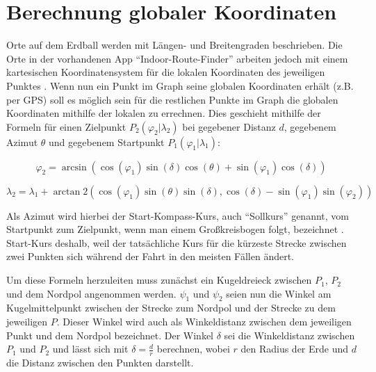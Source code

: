 
\section{Berechnung globaler Koordinaten}
Orte auf dem Erdball werden mit Längen- und Breitengraden beschrieben. Die Orte in der vorhandenen App \enquote{Indoor-Route-Finder} arbeiten jedoch mit einem kartesischen Koordinatensystem für die lokalen Koordinaten des jeweiligen Punktes \cite{kneer_benjamin_indoor_2017}. Wenn nun ein Punkt im Graph seine globalen Koordinaten erhält (z.B. per GPS) soll es möglich sein für die restlichen Punkte im Graph die globalen Koordinaten mithilfe der lokalen zu errechnen. Dies geschieht mithilfe der Formeln für einen Zielpunkt $P_2(\varphi_2|\lambda_2)$ bei gegebener Distanz $d$, gegebenem Azimut $\theta$ und gegebenem Startpunkt $P_1(\varphi_1|\lambda_1)$:

\begin{equation}
\tag{1}
\varphi_2 = \arcsin\left(
\cos(\varphi_1)\sin(\delta)\cos(\theta) + \sin(\varphi_1)\cos(\delta)
\right)
\end{equation}

\begin{equation}
\tag{2}
\lambda_2 = \lambda_1 + \arctan2\left(\cos(\varphi_1)\sin(\theta)\sin(\delta), \cos(\delta) - \sin(\varphi_1)\sin(\varphi_2)\right)
\end{equation}

Als Azimut wird hierbei der Start-Kompass-Kurs, auch \enquote{Sollkurs} genannt, vom Startpunkt zum Zielpunkt, wenn man einem Großkreisbogen folgt, bezeichnet \cite{us_army_map_1993}. Start-Kurs deshalb, weil der tatsächliche Kurs für die kürzeste Strecke zwischen zwei Punkten sich während der Fahrt in den meisten Fällen ändert.

Um diese Formeln herzuleiten muss zunächst ein Kugeldreieck zwischen $P_1$, $P_2$ und dem Nordpol angenommen werden. $\psi_1$ und $\psi_2$ seien nun die Winkel am Kugelmittelpunkt zwischen der Strecke zum Nordpol und der Strecke zu dem jeweiligen $P$. Dieser Winkel wird auch als Winkeldistanz zwischen dem jeweiligen Punkt und dem Nordpol bezeichnet. Der Winkel $\delta$ sei die Winkeldistanz zwischen $P_1$ und $P_2$ und lässt sich mit $\delta = \frac{d}{r}$ berechnen, wobei $r$ den Radius der Erde und $d$ die Distanz zwischen den Punkten darstellt.

